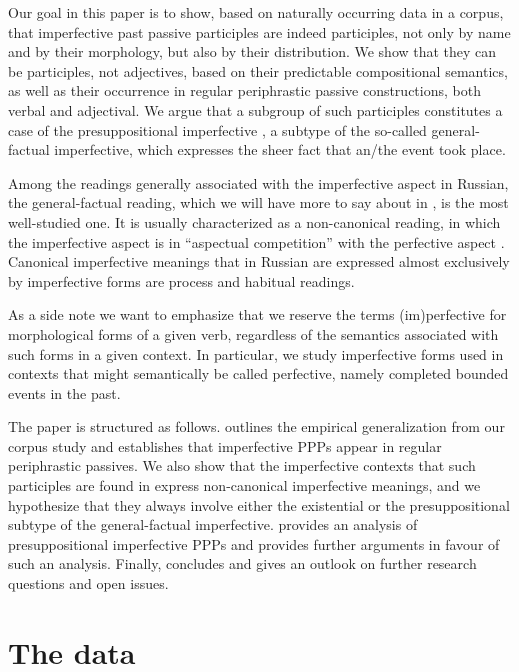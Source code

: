 \documentclass[output=paper,modfonts,newtxmath,hidelinks
]{langscibook}
\begin{document}
Our goal in this paper is to show, based on naturally occurring data in a corpus, that imperfective past passive participles are indeed participles, not only by name and by their morphology, but also by their distribution. We show that they can be participles, not adjectives, based on their predictable compositional semantics, as well as their occurrence in regular periphrastic passive constructions, both verbal and adjectival. We argue that a subgroup of such participles constitutes a case of the presuppositional imperfective \citep[in the sense of][]{gronndiss}, a subtype of the so-called general-factual imperfective, which expresses the sheer fact that an/the event took place. 

Among the readings generally associated with the imperfective aspect in Russian, the general-factual reading, which we will have more to say about in , is the most well-studied one. It is usually characterized as a non-canonical reading, in which the imperfective aspect is in ``aspectual competition'' with the perfective aspect \citep[a term that goes back to at least][]{mathesius38}. Canonical imperfective meanings that in Russian are expressed almost exclusively by imperfective forms are process and habitual readings. 

\largerpage[2]
As a side note we want to emphasize that we reserve the terms (im)perfective for morphological forms of a given verb, regardless of the semantics associated with such forms in a given context. In particular, we study imperfective forms used in contexts that might semantically be called perfective, namely completed bounded events in the past.

The paper is structured as follows.  outlines the empirical generalization from our corpus study and establishes that imperfective PPPs appear in regular periphrastic passives. We also show that the imperfective contexts that such participles are found in express non-canonical imperfective meanings, and we hypothesize that they always involve either the existential or the presuppositional subtype of the general-factual imperfective.  provides an analysis of presuppositional imperfective PPPs and provides further arguments in favour of such an analysis. Finally,  concludes and gives an outlook on further research questions and open issues. 

\section{The data}
\label{data}
\end{document}

